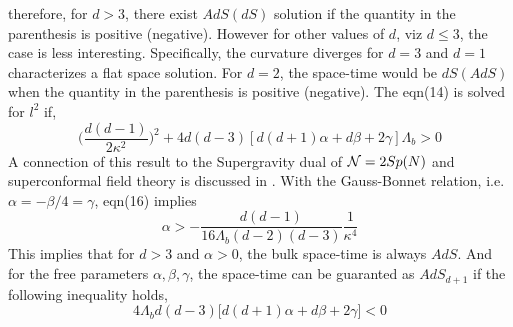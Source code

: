 \documentclass[a4paper,12pt]{article}
\begin{document}
therefore, for $d>3$, there exist $AdS(dS)$ solution if the quantity
in the parenthesis is positive (negative). However for other values of 
$d$, viz $d\leq 3$, the case is less interesting. Specifically, the curvature 
diverges for $d=3$ and $d=1$ characterizes a flat space solution. For $d=2$, 
the space-time would be $dS (AdS)$ when the quantity in the parenthesis is 
positive (negative). The eqn(14) is solved for $l^2$ if,
\begin{equation}
\Big(\frac{d(d-1)}{2\kappa^2}\Big)^2+
4d(d-3)\left[d(d+1)\alpha+d\beta+2\gamma\right]\Lambda_b>0
\end{equation}
A connection of this result to the Supergravity dual of 
${\cal N}=2 Sp(N)$ and superconformal field theory is discussed in 
\cite{NOJ}. With the Gauss-Bonnet relation, 
i.e. $\alpha=-\beta/4=\gamma$, eqn(16) implies 
\begin{equation}
\alpha>-\frac{d(d-1)}{16\Lambda_b(d-2)(d-3)} \frac{1}{\kappa^4}
\end{equation}
This implies that for $d>3$ and $\alpha >0$, the bulk space-time is always 
$AdS$. And for the free parameters $\alpha, \beta, \gamma$, the space-time 
can be guaranted as $AdS_{d+1}$ if the following inequality holds,
\begin{equation}
4\Lambda_b d(d-3)\big[d(d+1)\alpha + d \beta + 2 \gamma \big] < 0
\end{equation}
\end{document}
